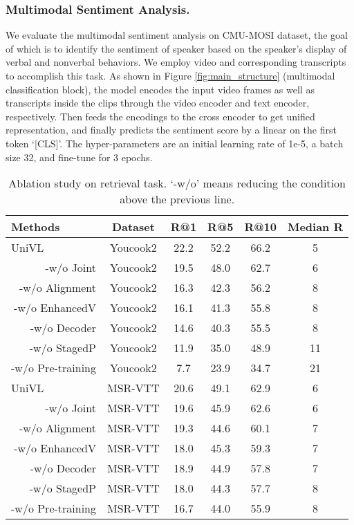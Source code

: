 \documentclass[11pt,a4paper]{article}
\begin{document}
	\subsubsection{Multimodal Sentiment Analysis.} 
	We evaluate the multimodal sentiment analysis on CMU-MOSI dataset, the goal of which is to identify the sentiment of speaker based on the speaker’s display of verbal and nonverbal behaviors. We employ video and corresponding transcripts to accomplish this task. As shown in Figure \ref{fig:main_structure} (multimodal classification block), the model encodes the input video frames as well as transcripts inside the clips through the video encoder and text encoder, respectively. Then feeds the encodings to the cross encoder to get unified representation, and finally predicts the sentiment score by a linear on the first token `[CLS]'. The hyper-parameters are an initial learning rate of 1e-5, a batch size 32, and fine-tune for 3 epochs.
	\begin{table*}[tp] 
		\centering
		\setlength{\tabcolsep}{3pt} \begin{tabular}{l|c|cccc}
			\toprule
			Methods  & Dataset & R@1   & R@5 & R@10 & Median R  \\
			\midrule
			UniVL    & Youcook2 & 22.2 & 52.2 & 66.2 & 5 \\
			\multicolumn{1}{r|}{-w/o Joint}   & Youcook2 & 19.5 & 48.0 & 62.7 & 6 \\
			\multicolumn{1}{r|}{-w/o Alignment}   & Youcook2 & 16.3 & 42.3 & 56.2 & 8 \\
			\multicolumn{1}{r|}{-w/o EnhancedV}  & Youcook2 & 16.1 & 41.3 & 55.8 & 8 \\
			\multicolumn{1}{r|}{-w/o Decoder}  & Youcook2 & 14.6 & 40.3 & 55.5 & 8 \\
			\multicolumn{1}{r|}{-w/o StagedP}  & Youcook2 & 11.9 & 35.0 & 48.9 & 11 \\
			\multicolumn{1}{r|}{-w/o Pre-training}  & Youcook2 & 7.7 & 23.9 & 34.7 & 21 \\
			\midrule
			UniVL    & MSR-VTT & 20.6 & 49.1 & 62.9 & 6 \\
			\multicolumn{1}{r|}{-w/o Joint}   & MSR-VTT & 19.6 & 45.9 & 62.6 & 6 \\
			\multicolumn{1}{r|}{-w/o Alignment}   & MSR-VTT & 19.3 & 44.6 & 60.1 & 7 \\
			\multicolumn{1}{r|}{-w/o EnhancedV}  & MSR-VTT & 18.0 & 45.3 & 59.3 & 7 \\
			\multicolumn{1}{r|}{-w/o Decoder}  & MSR-VTT & 18.9 & 44.9 & 57.8 & 7 \\
			\multicolumn{1}{r|}{-w/o StagedP}  & MSR-VTT & 18.0 & 44.3 & 57.7 & 8 \\
			\multicolumn{1}{r|}{-w/o Pre-training}  & MSR-VTT & 16.7 & 44.0 & 55.9 & 8 \\
			\bottomrule
		\end{tabular}
\caption{Ablation study on retrieval task. `-w/o' means reducing the condition above the previous line.}
		\label{tab:result_of_ablation_retrieval}
	\end{table*}
	
\end{document}
